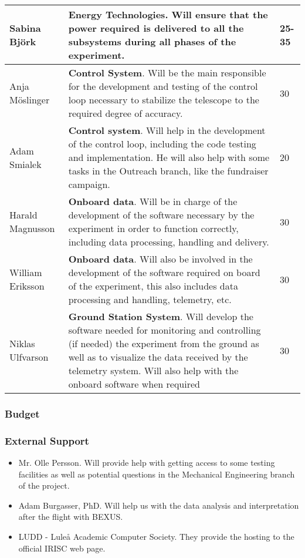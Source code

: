 \begin{longtable}{m{} | m{} | m{}}
	Sabina Bj{\"o}rk & \textbf{Energy Technologies}. Will ensure that the power required is delivered to all the subsystems during all phases of the experiment. & 25-35 \\ \hline
	Anja M{\"o}slinger & \textbf{Control System}. Will be the main responsible for the development and testing of the control loop necessary to stabilize the telescope to the required degree of accuracy. & 30 \\ \hline
	Adam Smialek & \textbf{Control system}.  Will help in the development of the control loop, including the code testing and implementation. He will also help with some tasks in the Outreach branch, like the fundraiser campaign. & 20 \\ \hline
	Harald Magnusson & \textbf{Onboard data}. Will be in charge of the development of the software necessary by the experiment in order to function correctly, including data processing, handling and delivery. & 30 \\ \hline
	William Eriksson & \textbf{Onboard data}. Will also be involved in the development of the software required on board of the experiment, this also includes data processing and handling, telemetry, etc. & 30 \\ \hline
	Niklas Ulfvarson & \textbf{Ground Station System}. Will develop the software needed for monitoring and controlling (if needed) the experiment from the ground as well as to visualize the data received by the telemetry system. Will also help with the onboard software when required & 30 \\ \hline 
	
	
\end{longtable}

\subsubsection{Budget}
\label{sec:3.2.2}



\subsubsection{External Support}

\begin{itemize}
	\item Mr. Olle Persson. Will provide help with getting access to some testing facilities as well as potential questions in the Mechanical Engineering branch of the project.
	\item Adam Burgasser, PhD. Will help us with the data analysis and interpretation after the flight with BEXUS.
	\item LUDD - Luleå Academic Computer Society. They provide the hosting to the official IRISC web page.
\end{itemize}

